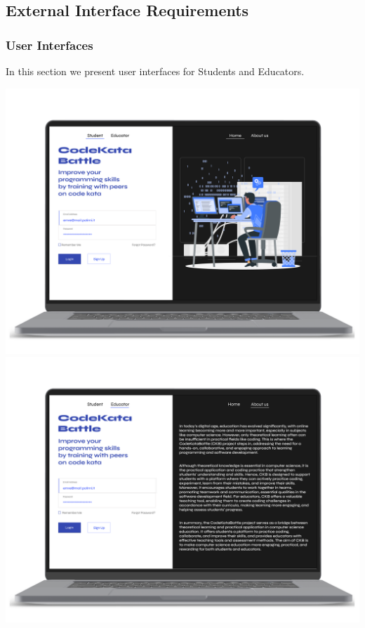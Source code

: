 \subsection{External Interface Requirements}

\subsubsection{User Interfaces}
In this section we present user interfaces for Students and Educators. 
\begin{center}
    \includegraphics[scale=0.13]{Images/ui-ux/login-signup/student_login.png}
    \includegraphics[scale=0.13]{Images/ui-ux/login-signup/educator_login.png}
\end{center}
